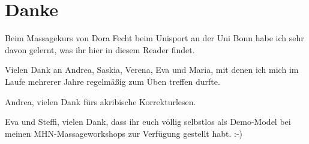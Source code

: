 \section*{Danke}

Beim Massagekurs von Dora Fecht beim Unisport an der Uni Bonn habe ich sehr davon gelernt, was ihr hier in diesem Reader findet.

Vielen Dank an Andrea, Saskia, Verena, Eva und Maria, mit denen ich mich im Laufe mehrerer Jahre regelmäßig zum Üben treffen durfte.

Andrea, vielen Dank fürs akribische Korrekturlesen.

Eva und Steffi, vielen Dank, dass ihr euch völlig selbstlos als Demo-Model bei meinen MHN-Massageworkshops zur Verfügung gestellt habt. :-)
